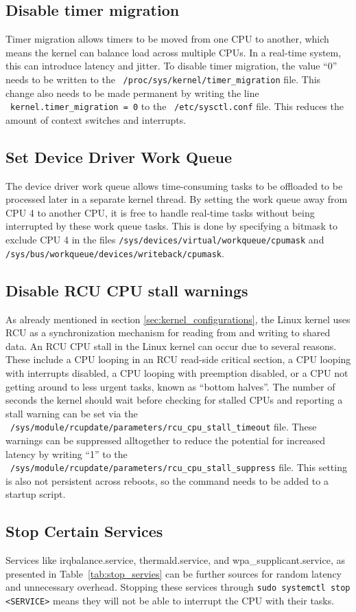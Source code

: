 \documentclass[MMR,Master,english]{twbook}
\begin{document}
\subsection{Disable timer migration}
Timer migration allows timers to be moved from one CPU to another, which means the kernel can balance load across multiple CPUs. In a real-time system, this can introduce latency and jitter. To disable timer migration, the value ``0'' needs to be written to the ~\texttt{/proc/sys/kernel/timer\_migration} file. This change also needs to be made permanent by writing the line ~\texttt{kernel.timer\_migration = 0} to the ~\texttt{/etc/sysctl.conf} file. This reduces the amount of context switches and interrupts.
\subsection{Set Device Driver Work Queue}
The device driver work queue allows time-consuming tasks to be offloaded to be processed later in a separate kernel thread. By setting the work queue away from CPU 4 to another CPU, it is free to handle real-time tasks without being interrupted by these work queue tasks. This is done by specifying a bitmask to exclude CPU 4 in the files \texttt{/sys/devices/virtual/workqueue/cpumask} and \texttt{/sys/bus/workqueue/devices/writeback/cpumask}.
\subsection{Disable RCU CPU stall warnings}
As already mentioned in section \ref{sec:kernel_configurations}, the Linux kernel uses RCU as a synchronization mechanism for reading from and writing to shared data. An RCU CPU stall in the Linux kernel can occur due to several reasons. These include a CPU looping in an RCU read-side critical section, a CPU looping with interrupts disabled, a CPU looping with preemption disabled, or a CPU not getting around to less urgent tasks, known as “bottom halves”. The number of seconds the kernel should wait before checking for stalled CPUs and reporting a stall warning can be set via the  ~\texttt{/sys/module/rcupdate/parameters/rcu\_cpu\_stall\_timeout} file. These warnings can be suppressed alltogether to reduce the potential for increased latency by writing ``1'' to the ~\texttt{/sys/module/rcupdate/parameters/rcu\_cpu\_stall\_suppress} file. This setting is also not persistent across reboots, so the command needs to be added to a startup script.
\subsection{Stop Certain Services}
Services like irqbalance.service, thermald.service, and wpa\_supplicant.service, as presented in Table~\ref{tab:stop_servies} can be further sources for random latency and unnecessary overhead. Stopping these services through \texttt{sudo systemctl stop <SERVICE>} means they will not be able to interrupt the CPU with their tasks.
\end{document}
